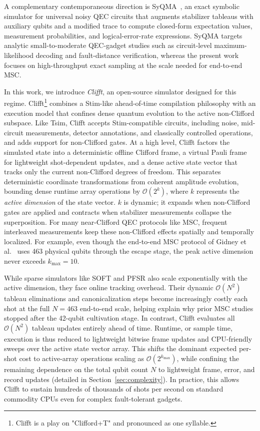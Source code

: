 \documentclass[a4paper, onecolumn, unpublished]{quantumarticle}
\begin{document}
    A complementary contemporaneous direction is SyQMA~\cite{umbrarescuSyQMAMemoryefficientSymbolic2026}, an exact symbolic simulator for universal noisy QEC circuits that augments stabilizer tableaus with auxiliary qubits and a modified trace to compute closed-form expectation values, measurement probabilities, and logical-error-rate expressions. SyQMA targets analytic small-to-moderate QEC-gadget studies such as circuit-level maximum-likelihood decoding and fault-distance verification, whereas the present work focuses on high-throughput exact sampling at the scale needed for end-to-end MSC.

    In this work, we introduce \emph{Clifft}, an open-source simulator designed for this regime. Clifft\footnote{Clifft is a play on "Clifford+T" and pronounced as one syllable.} combines a Stim-like ahead-of-time compilation philosophy with an execution model that confines dense quantum evolution to the active non-Clifford subspace. Like Tsim, Clifft accepts Stim-compatible circuits, including noise, mid-circuit measurements, detector annotations, and classically controlled operations, and adds support for non-Clifford gates. At a high level, Clifft factors the simulated state into a deterministic offline Clifford frame, a virtual Pauli frame for lightweight shot-dependent updates, and a dense active state vector that tracks only the current non-Clifford degrees of freedom. This separates deterministic coordinate transformations from coherent amplitude evolution, bounding dense runtime array operations by $\mathcal{O}(2^{k})$, where $k$ represents the \textit{active dimension} of the state vector. $k$ is dynamic; it expands when non-Clifford gates are applied and contracts when stabilizer measurements collapse the superposition. For many near-Clifford QEC protocols like MSC, frequent interleaved measurements keep these non-Clifford effects spatially and temporally localized. For example, even though the end-to-end MSC protocol of Gidney et al.~\cite{gidneyMagicStateCultivation2024} uses 463 physical qubits through the escape stage, the peak active dimension never exceeds $k_{\max} = 10$.

    While sparse simulators like SOFT and PFSR also scale exponentially with the active dimension, they face online tracking overhead. Their dynamic $\mathcal{O}(N^2)$ tableau eliminations and canonicalization steps become increasingly costly each shot at the full $N=463$ end-to-end scale, helping explain why prior MSC studies stopped after the 42-qubit cultivation stage. In contrast, Clifft evaluates all $\mathcal{O}(N^2)$ tableau updates entirely ahead of time. Runtime, or sample time, execution is thus reduced to lightweight bitwise frame updates and CPU-friendly sweeps over the active state vector array. This shifts the dominant expected per-shot cost to active-array operations scaling as $\mathcal{O}(2^{k_{\max}})$, while confining the remaining dependence on the total qubit count $N$ to lightweight frame, error, and record updates (detailed in Section~\ref{sec:complexity}). In practice, this allows Clifft to sustain hundreds of thousands of shots per second on standard commodity CPUs even for complex fault-tolerant gadgets.
\end{document}
